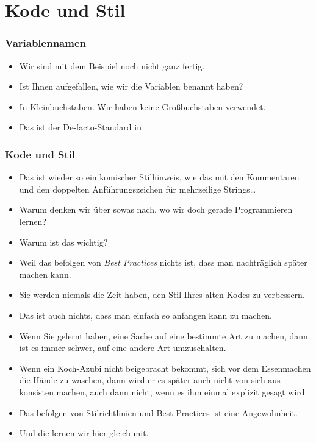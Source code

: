 \documentclass[aspectratio=169,mathserif,notheorems]{beamer}%
\begin{document}
\section{Kode und Stil}%
%
\begin{frame}%
\frametitle{Variablennamen}%
\begin{itemize}%
\item Wir sind mit dem Beispiel noch nicht ganz fertig.%
\item<2-> Ist Ihnen aufgefallen, wie wir die Variablen benannt haben?%
\item<3-> In Kleinbuchstaben. Wir haben keine Großbuchstaben verwendet.%
\item<4-> Das ist der De-facto-Standard in \python{}%
\end{itemize}%
%
%
\end{frame}%
%
\begin{frame}%
\frametitle{Kode und Stil}%
\begin{itemize}%
\item Das ist wieder so ein komischer Stilhinweis, wie das mit den Kommentaren und den doppelten Anführungszeichen für mehrzeilige Strings\dots%
\item<2-> Warum denken wir über sowas nach, wo wir doch gerade Programmieren lernen?%
\item<3-> Warum ist das wichtig?%
\item<4-> Weil das befolgen von \emph{Best Practices} nichts ist, dass man nachträglich später machen kann.%
\item<5-> Sie werden \alert{niemals} die Zeit haben, den Stil Ihres alten Kodes zu verbessern.%
\item<6-> Das ist auch nichts, dass man einfach so anfangen kann zu machen.%
\item<7-> Wenn Sie gelernt haben, eine Sache auf eine bestimmte Art zu machen, dann ist es immer schwer, auf eine andere Art umzuschalten.%
\item<8-> Wenn ein Koch-Azubi nicht beigebracht bekommt, sich vor dem Essenmachen die Hände zu waschen, dann wird er es später auch nicht von sich aus konsisten machen, auch dann nicht, wenn es ihm einmal explizit gesagt wird.%
\item<9-> Das befolgen von Stilrichtlinien und Best Practices ist eine Angewohnheit.%
\item<10-> Und die lernen wir hier gleich mit.%
\end{itemize}%
\end{frame}%
\end{document}
